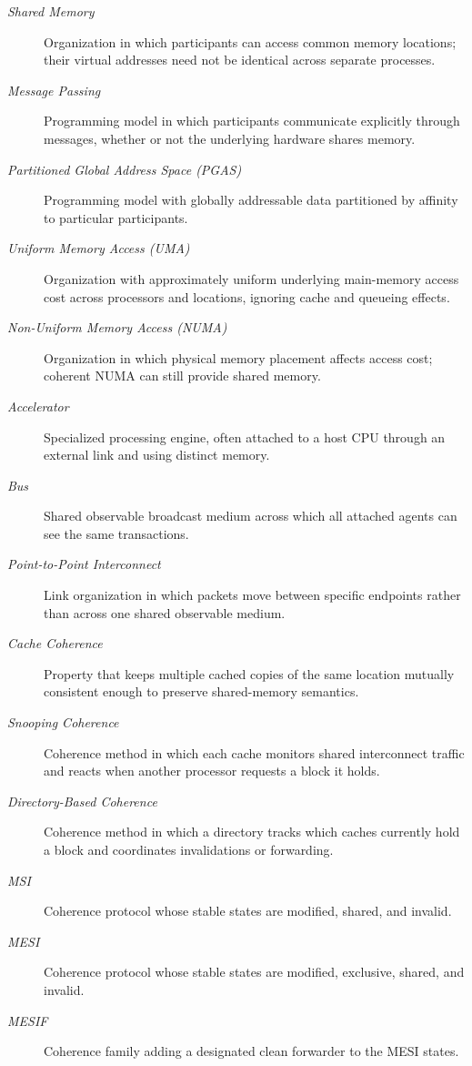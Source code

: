\begin{description}
    \item[\textit{Shared Memory}] Organization in which participants can access common memory locations; their virtual addresses need not be identical across separate processes.
    \item[\textit{Message Passing}] Programming model in which participants communicate explicitly through messages, whether or not the underlying hardware shares memory.
    \item[\textit{Partitioned Global Address Space (PGAS)}] Programming model with globally addressable data partitioned by affinity to particular participants.
    \item[\textit{Uniform Memory Access (UMA)}] Organization with approximately uniform underlying main-memory access cost across processors and locations, ignoring cache and queueing effects.
    \item[\textit{Non-Uniform Memory Access (NUMA)}] Organization in which physical memory placement affects access cost; coherent NUMA can still provide shared memory.
    \item[\textit{Accelerator}] Specialized processing engine, often attached to a host CPU through an external link and using distinct memory.
    \item[\textit{Bus}] Shared observable broadcast medium across which all attached agents can see the same transactions.
    \item[\textit{Point-to-Point Interconnect}] Link organization in which packets move between specific endpoints rather than across one shared observable medium.
    \item[\textit{Cache Coherence}] Property that keeps multiple cached copies of the same location mutually consistent enough to preserve shared-memory semantics.
    \item[\textit{Snooping Coherence}] Coherence method in which each cache monitors shared interconnect traffic and reacts when another processor requests a block it holds.
    \item[\textit{Directory-Based Coherence}] Coherence method in which a directory tracks which caches currently hold a block and coordinates invalidations or forwarding.
    \item[\textit{MSI}] Coherence protocol whose stable states are modified, shared, and invalid.
    \item[\textit{MESI}] Coherence protocol whose stable states are modified, exclusive, shared, and invalid.
    \item[\textit{MESIF}] Coherence family adding a designated clean forwarder to the MESI states.

\end{description}
